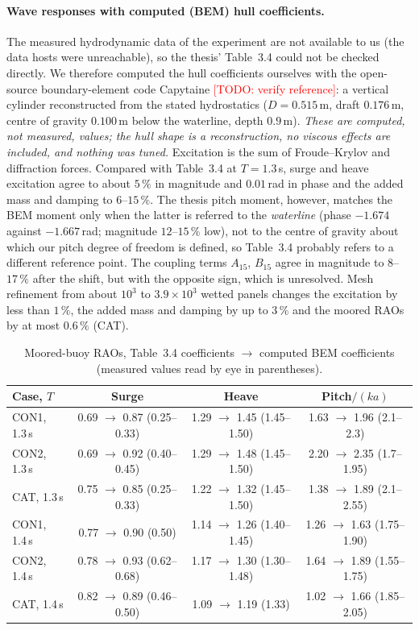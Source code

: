 \documentclass[11pt,a4paper]{article}
\newcommand{\todo}[1]{\textcolor{red}{[TODO: #1]}}
\begin{document}
\paragraph{Wave responses with computed (BEM) hull coefficients.} The measured hydrodynamic data of the experiment are not available to us (the data hosts were unreachable), so the thesis' Table~3.4 could not be checked directly. We therefore computed the hull coefficients ourselves with the open-source boundary-element code Capytaine \cite{ancellin2019} \todo{verify reference}: a vertical cylinder reconstructed from the stated hydrostatics ($D=0.515$\,m, draft $0.176$\,m, centre of gravity $0.100$\,m below the waterline, depth $0.9$\,m). \emph{These are computed, not measured, values; the hull shape is a reconstruction, no viscous effects are included, and nothing was tuned.} Excitation is the sum of Froude--Krylov and diffraction forces. Compared with Table~3.4 at $T=1.3$\,s, surge and heave excitation agree to about $5\,\%$ in magnitude and $0.01$\,rad in phase and the added mass and damping to $6$--$15\,\%$. The thesis pitch moment, however, matches the BEM moment only when the latter is referred to the \emph{waterline} (phase $-1.674$ against $-1.667$\,rad; magnitude $12$--$15\,\%$ low), not to the centre of gravity about which our pitch degree of freedom is defined, so Table~3.4 probably refers to a different reference point. The coupling terms $A_{15}$, $B_{15}$ agree in magnitude to $8$--$17\,\%$ after the shift, but with the opposite sign, which is unresolved. Mesh refinement from about $10^3$ to $3.9\times10^3$ wetted panels changes the excitation by less than $1\,\%$, the added mass and damping by up to $3\,\%$ and the moored RAOs by at most $0.6\,\%$ (CAT).
\begin{table}[h]
\centering\small
\begin{tabular}{lccc}
\toprule
Case, $T$ & Surge & Heave & Pitch$/(ka)$ \\
\midrule
CON1, 1.3\,s & 0.69 $\to$ 0.87 (0.25--0.33) & 1.29 $\to$ 1.45 (1.45--1.50) & 1.63 $\to$ 1.96 (2.1--2.3) \\
CON2, 1.3\,s & 0.69 $\to$ 0.92 (0.40--0.45) & 1.29 $\to$ 1.48 (1.45--1.50) & 2.20 $\to$ 2.35 (1.7--1.95) \\
CAT, 1.3\,s  & 0.75 $\to$ 0.85 (0.25--0.33) & 1.22 $\to$ 1.32 (1.45--1.50) & 1.38 $\to$ 1.89 (2.1--2.55) \\
CON1, 1.4\,s & 0.77 $\to$ 0.90 (0.50) & 1.14 $\to$ 1.26 (1.40--1.45) & 1.26 $\to$ 1.63 (1.75--1.90) \\
CON2, 1.4\,s & 0.78 $\to$ 0.93 (0.62--0.68) & 1.17 $\to$ 1.30 (1.30--1.48) & 1.64 $\to$ 1.89 (1.55--1.75) \\
CAT, 1.4\,s  & 0.82 $\to$ 0.89 (0.46--0.50) & 1.09 $\to$ 1.19 (1.33) & 1.02 $\to$ 1.66 (1.85--2.05) \\
\bottomrule
\end{tabular}
\caption{Moored-buoy RAOs, Table~3.4 coefficients $\to$ computed BEM coefficients (measured values read by eye in parentheses).}\label{tab:bem}
\end{table}
\end{document}
